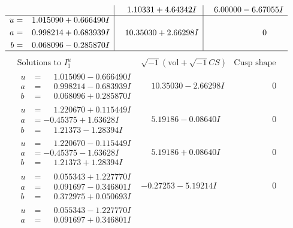 \documentclass[1p]{elsarticle_modified}
\theoremstyle{definition}
\newcommand{\I}{\sqrt{-1}}
\begin{document}
$$\begin{array}{c|c|c}
 & \phantom{-}1.10331 + 4.64342 I & \phantom{-}6.00000 - 6.67055 I \\ \hline\begin{aligned}
u &= \phantom{-}1.015090 + 0.666490 I \\
a &= \phantom{-}0.998214 + 0.683939 I \\
b &= \phantom{-}0.068096 - 0.285870 I\end{aligned}
 & \phantom{-}10.35030 + 2.66298 I & \phantom{-0.000000 } 0\\
 \hline 
 \end{array}$$\newpage$$\begin{array}{c|c|c}  
\text{Solutions to }I^u_{1}& \I (\text{vol} + \sqrt{-1}CS) & \text{Cusp shape}\\
 \hline 
\begin{aligned}
u &= \phantom{-}1.015090 - 0.666490 I \\
a &= \phantom{-}0.998214 - 0.683939 I \\
b &= \phantom{-}0.068096 + 0.285870 I\end{aligned}
 & \phantom{-}10.35030 - 2.66298 I & \phantom{-0.000000 } 0 \\ \hline\begin{aligned}
u &= \phantom{-}1.220670 + 0.115449 I \\
a &= -0.45375 + 1.63628 I \\
b &= \phantom{-}1.21373 - 1.28394 I\end{aligned}
 & \phantom{-}5.19186 - 0.08640 I & \phantom{-0.000000 } 0 \\ \hline\begin{aligned}
u &= \phantom{-}1.220670 - 0.115449 I \\
a &= -0.45375 - 1.63628 I \\
b &= \phantom{-}1.21373 + 1.28394 I\end{aligned}
 & \phantom{-}5.19186 + 0.08640 I & \phantom{-0.000000 } 0 \\ \hline\begin{aligned}
u &= \phantom{-}0.055343 + 1.227770 I \\
a &= \phantom{-}0.091697 - 0.346801 I \\
b &= \phantom{-}0.372975 + 0.050693 I\end{aligned}
 & -0.27253 - 5.19214 I & \phantom{-0.000000 } 0 \\ \hline\begin{aligned}
u &= \phantom{-}0.055343 - 1.227770 I \\
a &= \phantom{-}0.091697 + 0.346801 I \\

\end{aligned}
\end{array}$$
\end{document}
